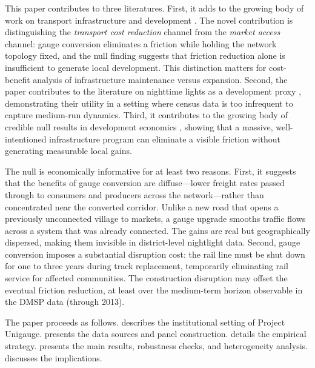 \documentclass[12pt]{article}
\begin{document}
This paper contributes to three literatures. First, it adds to the growing body of work on transport infrastructure and development \citep{donaldson2018railroads, asher2020rural, jedwab2017heterogeneous, faber2014trade, ghani2016highways, storeygard2016farther}. The novel contribution is distinguishing the \emph{transport cost reduction} channel from the \emph{market access} channel: gauge conversion eliminates a friction while holding the network topology fixed, and the null finding suggests that friction reduction alone is insufficient to generate local development. This distinction matters for cost-benefit analysis of infrastructure maintenance versus expansion. Second, the paper contributes to the literature on nighttime lights as a development proxy \citep{henderson2012measuring, michalopoulos2013pre, hodler2014regional}, demonstrating their utility in a setting where census data is too infrequent to capture medium-run dynamics. Third, it contributes to the growing body of credible null results in development economics \citep{mckenzie2021small, young2019channeling}, showing that a massive, well-intentioned infrastructure program can eliminate a visible friction without generating measurable local gains.

The null is economically informative for at least two reasons. First, it suggests that the benefits of gauge conversion are diffuse---lower freight rates passed through to consumers and producers across the network---rather than concentrated near the converted corridor. Unlike a new road that opens a previously unconnected village to markets, a gauge upgrade smooths traffic flows across a system that was already connected. The gains are real but geographically dispersed, making them invisible in district-level nightlight data. Second, gauge conversion imposes a substantial disruption cost: the rail line must be shut down for one to three years during track replacement, temporarily eliminating rail service for affected communities. The construction disruption may offset the eventual friction reduction, at least over the medium-term horizon observable in the DMSP data (through 2013).

The paper proceeds as follows.  describes the institutional setting of Project Unigauge.  presents the data sources and panel construction.  details the empirical strategy.  presents the main results, robustness checks, and heterogeneity analysis.  discusses the implications.
\end{document}
